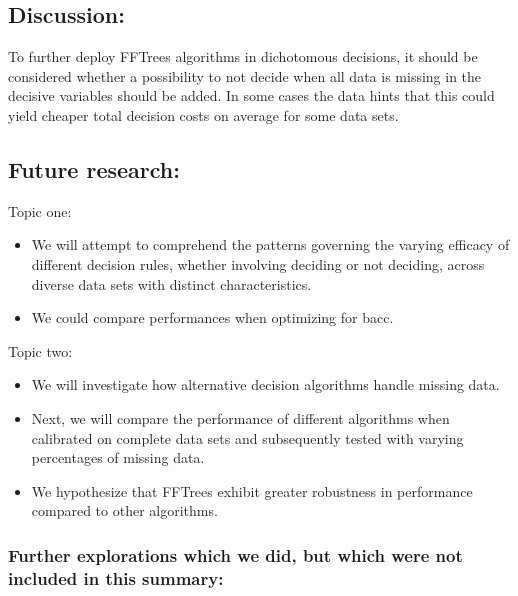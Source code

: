 \documentclass[
]{article}
\begin{document}
\hypertarget{discussion}{%
\subsection{Discussion:}\label{discussion}}

To further deploy FFTrees algorithms in dichotomous decisions, it should
be considered whether a possibility to not decide when all data is
missing in the decisive variables should be added. In some cases the
data hints that this could yield cheaper total decision costs on average
for some data sets.

\hypertarget{future-research}{%
\subsection{Future research:}\label{future-research}}

Topic one:

\begin{itemize}
\item
  We will attempt to comprehend the patterns governing the varying
  efficacy of different decision rules, whether involving deciding or
  not deciding, across diverse data sets with distinct characteristics.
\item
  We could compare performances when optimizing for bacc.
\end{itemize}

Topic two:

\begin{itemize}
\item
  We will investigate how alternative decision algorithms handle missing
  data.
\item
  Next, we will compare the performance of different algorithms when
  calibrated on complete data sets and subsequently tested with varying
  percentages of missing data.
\item
  We hypothesize that FFTrees exhibit greater robustness in performance
  compared to other algorithms.
\end{itemize}

\hypertarget{further-explorations-which-we-did-but-which-were-not-included-in-this-summary}{%
\subsubsection{Further explorations which we did, but which were not
included in this
summary:}\label{further-explorations-which-we-did-but-which-were-not-included-in-this-summary}}
\end{document}
